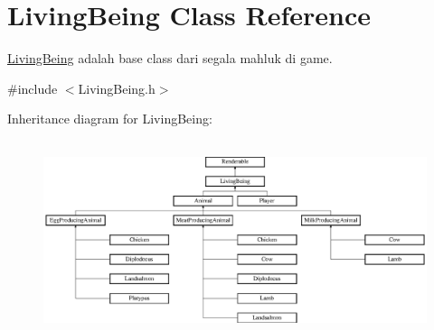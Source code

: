 \hypertarget{classLivingBeing}{}\section{Living\+Being Class Reference}
\label{classLivingBeing}


\mbox{\hyperlink{classLivingBeing}{Living\+Being}} adalah base class dari segala mahluk di game.  




{\ttfamily \#include $<$Living\+Being.\+h$>$}

Inheritance diagram for Living\+Being\+:\begin{figure}[H]
\begin{center}
\leavevmode
\includegraphics[height=5.833333cm]{classLivingBeing}
\end{center}
\end{figure}
